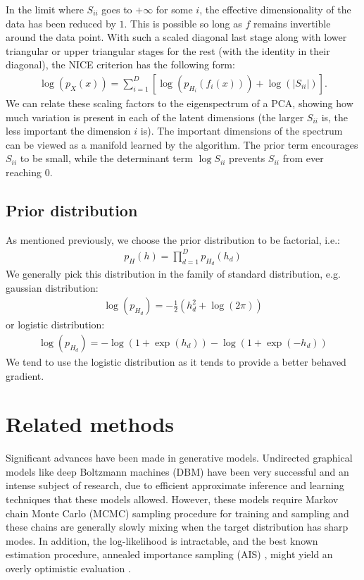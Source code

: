 \documentclass{article}
\begin{document}
In the limit where $S_{ii}$ goes to $+\infty$ for some $i$,
the effective dimensionality of the data has been reduced by $1$. This is possible so long as
$f$ remains invertible around the data point. With such a scaled diagonal last stage along with lower triangular
or upper triangular stages for the rest (with the identity in their diagonal),
the NICE criterion has the following form:
\begin{align*}
\log(p_X(x)) = \sum_{i=1}^{D}{\left[\log(p_{H_{i}}(f_{i}(x))) + \log(\lvert S_{ii} \rvert)\right]}.
\end{align*}
We can relate these scaling factors to the eigenspectrum of a PCA, showing how much variation
is present in each of the latent dimensions
(the larger $S_{ii}$ is, the less important the dimension $i$ is).  
The important dimensions of the spectrum can be viewed as a manifold learned by the algorithm. 
The prior term encourages $S_{ii}$ to be small, while the determinant
term $\log S_{ii}$ prevents $S_{ii}$ from ever reaching $0$.

\subsection{Prior distribution}
As mentioned previously, we choose the prior distribution to be factorial,
i.e.:
\begin{align*}
p_H(h) = \prod_{d=1}^{D}{p_{H_{d}}(h_{d})}
\end{align*}
We generally pick this distribution in the family of standard distribution,
e.g. gaussian distribution:
\begin{align*}
\log(p_{H_{d}}) = -\frac{1}{2}(h_{d}^{2} + \log(2 \pi))
\end{align*}
or logistic distribution:
\begin{align*}
\log(p_{H_{d}}) = -\log(1 + \exp(h_d)) - \log(1 + \exp(-h_d))
\end{align*}
We tend to use the logistic distribution as it tends to provide a better
behaved gradient.

\section{Related methods}


Significant advances have been made in generative models. Undirected
graphical models like deep Boltzmann machines (DBM) \citep{SalHinton09}
have been very successful and an intense subject of research, due to efficient approximate
inference and learning techniques that these models allowed. However, these
models require Markov chain Monte Carlo (MCMC) sampling procedure for training
and sampling and these chains are generally slowly mixing when the target
distribution has sharp modes. In addition, 
the log-likelihood is intractable, and the best known estimation procedure,
annealed importance sampling (AIS)
\citep{Salakhutdinov+Murray-2008}, might yield an overly optimistic
evaluation \citep{Grosse-et-al-ICML2013}.
\end{document}
